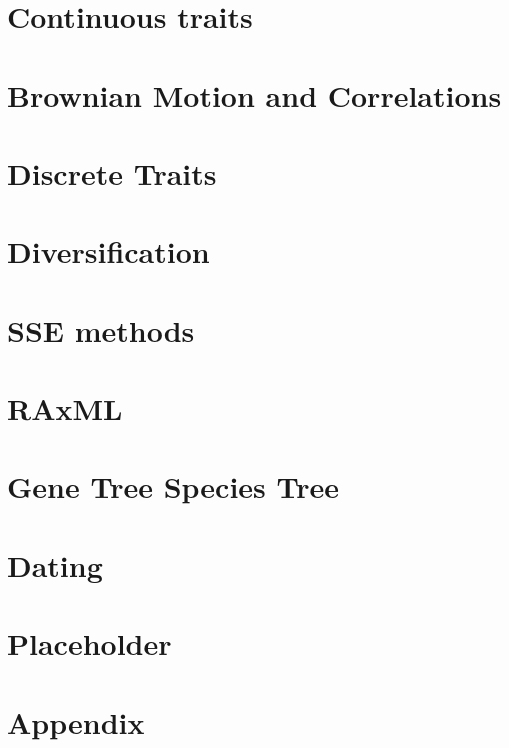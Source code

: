 \documentclass[]{book}
\theoremstyle{definition}
\theoremstyle{definition}
\theoremstyle{remark}
\begin{document}
\chapter{Continuous traits}\label{continuous-traits}

\chapter{Brownian Motion and
Correlations}\label{brownian-motion-and-correlations}

\chapter{Discrete Traits}\label{discrete-traits}

\chapter{Diversification}\label{diversification}

\chapter{SSE methods}\label{sse-methods}

\chapter{RAxML}\label{raxml}

\chapter{Gene Tree Species Tree}\label{gene-tree-species-tree}

\chapter{Dating}\label{dating}

\chapter{Placeholder}\label{placeholder}

\chapter{Appendix}\label{appendix}


\end{document}
